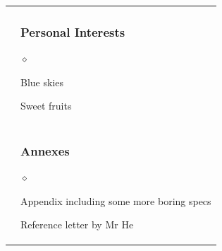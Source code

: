 \documentclass[a4paper]{article}
\newlength{\sectsep}
\newlength{\subsectsep}
\renewenvironment{itemize}{
  \begin{list}{$\diamond$}{
    \setlength{\topsep}{0.25em}
    \setlength{\itemsep}{0em}
    \setlength{\parskip}{0pt}
    \setlength{\parsep}{0em}
  }
}{
  \end{list}
}
\begin{document}
\begin{longtable}{r || l}
  & \begin{minipage}{0.9\textwidth}
      \vspace{\subsectsep}
      \subsubsection*{Personal Interests}
      \begin{itemize}
          \item Blue skies
          \item Sweet fruits
      \end{itemize}
  \end{minipage} \\[\sectsep]

  & \begin{minipage}{0.9\textwidth}
      \vspace{\subsectsep}
      \subsubsection*{Annexes}
      \begin{itemize}
          \item Appendix including some more boring specs
          \item Reference letter by Mr He
      \end{itemize}
      \vfill
    \end{minipage} \\

  \end{longtable}
\end{document}
